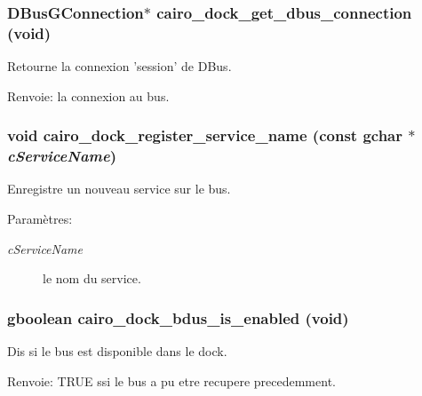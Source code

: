\subsubsection{\setlength{\rightskip}{0pt plus 5cm}DBusGConnection$\ast$ cairo\_\-dock\_\-get\_\-dbus\_\-connection (void)}\label{cairo-dock-dbus_8h_1813624dabbef2d5b9f247106372c5a6}


Retourne la connexion 'session' de DBus. \begin{Desc}
\item[Renvoie:]la connexion au bus. \end{Desc}
\subsubsection{\setlength{\rightskip}{0pt plus 5cm}void cairo\_\-dock\_\-register\_\-service\_\-name (const gchar $\ast$ {\em cServiceName})}\label{cairo-dock-dbus_8h_0a1d26dfa93988a16756512e467b9ed0}


Enregistre un nouveau service sur le bus. \begin{Desc}
\item[Paramètres:]
\begin{description}
\item[{\em cServiceName}]le nom du service. \end{description}
\end{Desc}
\subsubsection{\setlength{\rightskip}{0pt plus 5cm}gboolean cairo\_\-dock\_\-bdus\_\-is\_\-enabled (void)}\label{cairo-dock-dbus_8h_8e64b42f79ff518bc8512529423756b5}


Dis si le bus est disponible dans le dock. \begin{Desc}
\item[Renvoie:]TRUE ssi le bus a pu etre recupere precedemment. \end{Desc}
